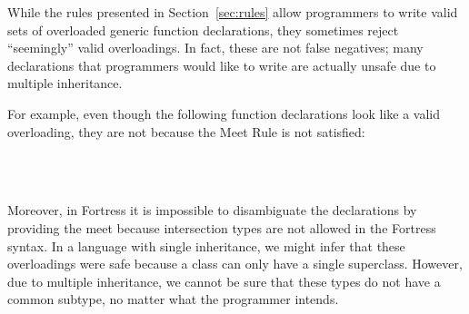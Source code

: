 





While the rules presented in Section~\ref{sec:rules} allow programmers to
write valid sets of overloaded generic function declarations,
they sometimes reject ``seemingly'' valid overloadings.
In fact, these are not false negatives;
many declarations that programmers would like to write are actually unsafe due to multiple inheritance.

For example, even though the following function declarations look like
a valid overloading, they are not because the Meet Rule is not satisfied:
\begin{FortressCode}
{\tt ~~}\+\, \COLON{} \\
  \, \COLON{}\-
\end{FortressCode}
Moreover, in Fortress it is impossible to disambiguate the declarations by providing the meet
because intersection types are not allowed in the Fortress syntax.
In a language with single inheritance, we might infer that these
overloadings were safe because a class can only have a single superclass.
However, due to multiple inheritance, we cannot be sure that these types
do not have a common subtype, no matter what the programmer intends.

